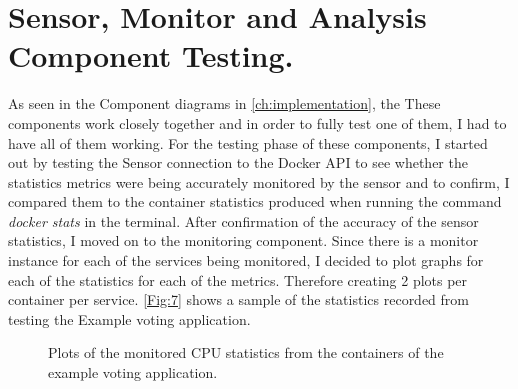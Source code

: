 \section{Sensor, Monitor and Analysis Component Testing.}
As seen in the Component diagrams in \autoref{ch:implementation}, the These components work closely together and in order to fully test one of them, I had to have all of them working. For the testing phase of these components, I started out by testing the Sensor connection to the Docker API to see whether the statistics metrics were being accurately monitored by the sensor and to confirm, I compared them to the container statistics produced when running the command \textit{docker stats} in the terminal. After confirmation of the accuracy of the sensor statistics, I moved on to the monitoring component. Since there is a monitor instance for each of the services being monitored, I decided to plot graphs for each of the statistics for each of the metrics. Therefore creating 2 plots per container per service. \autoref{Fig:7} shows a sample of the statistics recorded from testing the Example voting application. 
\begin{figure}[H]
\centering
  \hfill
  \hfill   
    \hfill
  \hfill
    \caption{Plots of the monitored CPU statistics from the containers of the example voting application.} 
   \label{Fig:7} 
\end{figure}

